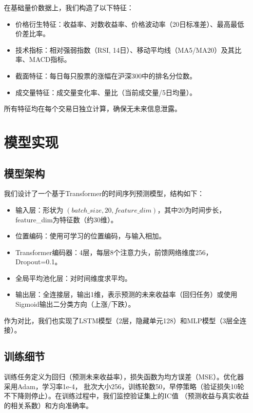 \documentclass[12pt]{article} %
\begin{document}
在基础量价数据上，我们构造了以下特征：
\begin{itemize}
    \item 价格衍生特征：收益率、对数收益率、价格波动率（20日标准差）、最高最低价差比率。
    \item 技术指标：相对强弱指数（RSI, 14日）、移动平均线（MA5/MA20）及其比率、MACD指标。
    \item 截面特征：每日每只股票的涨幅在沪深300中的排名分位数。
    \item 成交量特征：成交量变化率、量比（当前成交量/5日均量）。
\end{itemize}
所有特征均在每个交易日独立计算，确保无未来信息泄露。

\section{模型实现}

\subsection{模型架构}

我们设计了一个基于Transformer的时间序列预测模型，结构如下：
\begin{itemize}
    \item 输入层：形状为 $(batch\_size, 20, feature\_dim)$，其中20为时间步长，feature\_dim为特征数（约30维）。
    \item 位置编码：使用可学习的位置编码，与输入相加。
    \item Transformer编码器：4层，每层8个注意力头，前馈网络维度256，Dropout=0.1。
    \item 全局平均池化层：对时间维度求平均。
    \item 输出层：全连接层，输出1维，表示预测的未来收益率（回归任务）或使用Sigmoid输出二分类方向（上涨/下跌）。
\end{itemize}
作为对比，我们也实现了LSTM模型（2层，隐藏单元128）和MLP模型（3层全连接）。

\subsection{训练细节}

训练任务定义为回归（预测未来收益率），损失函数为均方误差（MSE）。优化器采用Adam，学习率1e-4，
批次大小256，训练轮数50，早停策略（验证损失10轮不下降则停止）。在训练过程中，我们监控验证集上的IC值
（预测收益与真实收益的相关系数）和方向准确率。

\end{document}
